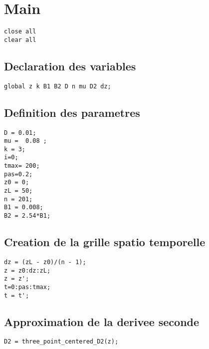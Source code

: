 \documentclass[10pt]{article}
\begin{document}
{\Huge\section*{Main}}

\tableofcontents
\vspace*{4em}

\begin{lstlisting}
close all
clear all
\end{lstlisting}


{}
\subsection*{Declaration des variables}

\begin{lstlisting}
global z k B1 B2 D n mu D2 dz;
\end{lstlisting}


{}
\subsection*{Definition des parametres}

\begin{lstlisting}
D = 0.01;
mu =  0.08 ;
k = 3;
i=0;
tmax= 200;
pas=0.2;
z0 = 0;
zL = 50;
n = 201;
B1 = 0.008;
B2 = 2.54*B1;
\end{lstlisting}


{}
\subsection*{Creation de la grille spatio temporelle}

\begin{lstlisting}
dz = (zL - z0)/(n - 1);
z = z0:dz:zL;
z = z';
t=0:pas:tmax;
t = t';
\end{lstlisting}


{}
\subsection*{Approximation de la derivee seconde}

\begin{lstlisting}
D2 = three_point_centered_D2(z);
\end{lstlisting}
\end{document}
